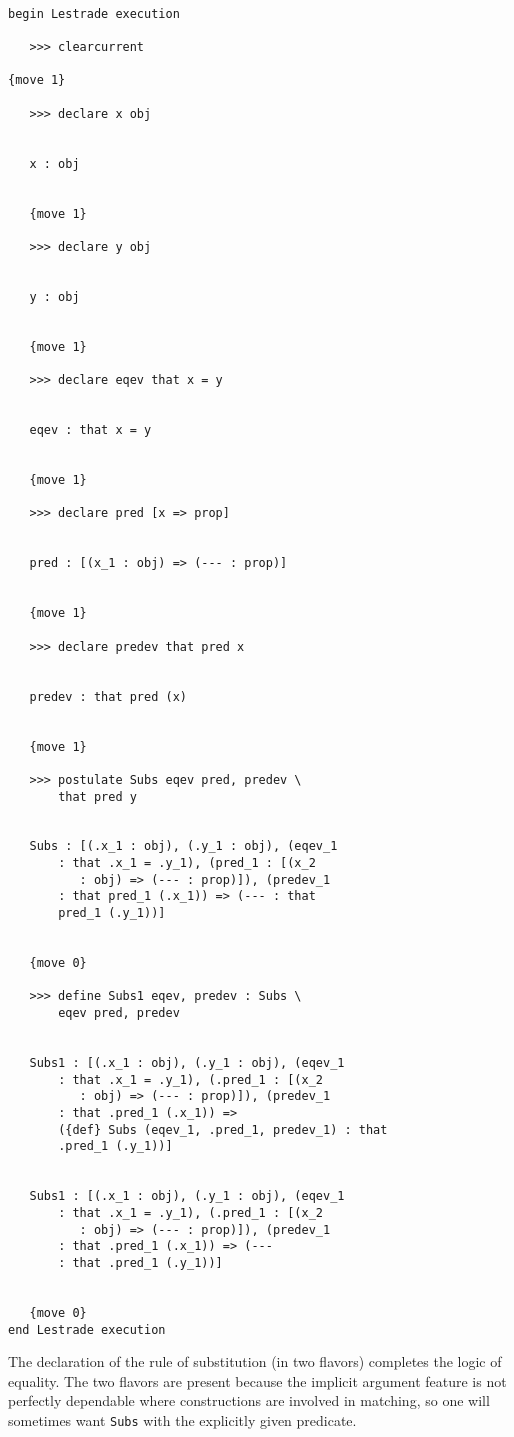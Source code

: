\documentclass[12pt]{article}
\begin{document}
\begin{verbatim}

begin Lestrade execution

   >>> clearcurrent

{move 1}

   >>> declare x obj


   x : obj


   {move 1}

   >>> declare y obj


   y : obj


   {move 1}

   >>> declare eqev that x = y


   eqev : that x = y


   {move 1}

   >>> declare pred [x => prop]


   pred : [(x_1 : obj) => (--- : prop)]


   {move 1}

   >>> declare predev that pred x


   predev : that pred (x)


   {move 1}

   >>> postulate Subs eqev pred, predev \
       that pred y


   Subs : [(.x_1 : obj), (.y_1 : obj), (eqev_1 
       : that .x_1 = .y_1), (pred_1 : [(x_2 
          : obj) => (--- : prop)]), (predev_1 
       : that pred_1 (.x_1)) => (--- : that 
       pred_1 (.y_1))]


   {move 0}

   >>> define Subs1 eqev, predev : Subs \
       eqev pred, predev


   Subs1 : [(.x_1 : obj), (.y_1 : obj), (eqev_1 
       : that .x_1 = .y_1), (.pred_1 : [(x_2 
          : obj) => (--- : prop)]), (predev_1 
       : that .pred_1 (.x_1)) => 
       ({def} Subs (eqev_1, .pred_1, predev_1) : that 
       .pred_1 (.y_1))]


   Subs1 : [(.x_1 : obj), (.y_1 : obj), (eqev_1 
       : that .x_1 = .y_1), (.pred_1 : [(x_2 
          : obj) => (--- : prop)]), (predev_1 
       : that .pred_1 (.x_1)) => (--- 
       : that .pred_1 (.y_1))]


   {move 0}
end Lestrade execution
\end{verbatim}

The declaration of the rule of substitution (in two flavors) completes the logic of equality.  The two flavors are present because the implicit argument feature is not perfectly dependable where constructions are involved in matching, so one will sometimes want {\tt Subs} with the explicitly given predicate.
\end{document}
